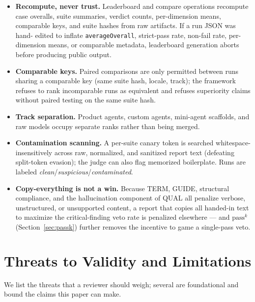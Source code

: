 \documentclass[11pt]{article}
\newcommand{\dimname}[1]{\textsc{#1}}
\newcommand{\passk}{$\mathrm{pass}^{k}$}
\begin{document}
\begin{itemize}[leftmargin=*]
\item \textbf{Recompute, never trust.} Leaderboard and compare operations
recompute case overalls, suite summaries, verdict counts, per-dimension means,
comparable keys, and suite hashes from raw artifacts. If a run JSON was hand-
edited to inflate \texttt{averageOverall}, strict-pass rate, non-fail rate,
per-dimension means, or comparable metadata, leaderboard generation aborts before
producing public output.
\item \textbf{Comparable keys.} Paired comparisons are only permitted between
runs sharing a comparable key (same suite hash, locale, track); the framework
refuses to rank incomparable runs as equivalent and refuses superiority claims
without paired testing on the same suite hash.
\item \textbf{Track separation.} Product agents, custom agents, mini-agent
scaffolds, and raw models occupy separate ranks rather than being merged.
\item \textbf{Contamination scanning.} A per-suite canary token is searched
whitespace-insensitively across raw, normalized, and sanitized report text
(defeating split-token evasion); the judge can also flag memorized boilerplate.
Runs are labeled \emph{clean}/\emph{suspicious}/\emph{contaminated}.
\item \textbf{Copy-everything is not a win.} Because \dimname{TERM},
\dimname{GUIDE}, structural compliance, and the hallucination component of
\dimname{QUAL} all penalize verbose, unstructured, or unsupported content, a
report that copies all handed-in text to maximize the critical-finding veto rate
is penalized elsewhere --- and \passk{} (Section~\ref{sec:passk}) further removes
the incentive to game a single-pass veto.
\end{itemize}

\section{Threats to Validity and Limitations}
\label{sec:limitations}

We list the threats that a reviewer should weigh; several are foundational and
bound the claims this paper can make.
\end{document}
